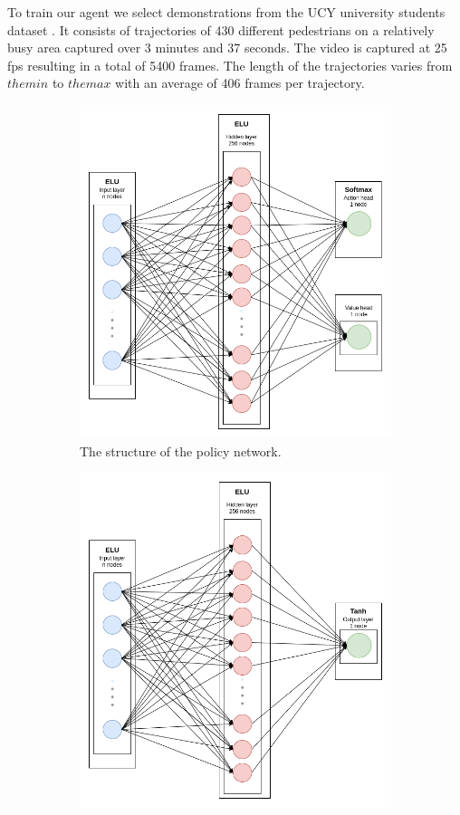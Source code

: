 To train our agent we select demonstrations from the UCY university students dataset \cite{ucy-dataset-university-students}. It consists of trajectories of 430 different pedestrians on a relatively busy area captured over 3 minutes and 37 seconds. The video is captured at 25 fps resulting in a total of 5400 frames. The length of the trajectories varies from $the min$  to $the max$ with an average of 406 frames per trajectory. 
\begin{figure}
    	\begin{subfigure}[b]{.5\textwidth}
    	\centering
    	\includegraphics[width=.9\linewidth]{figures/policy_network.png}
    	\caption{The structure of the policy network.}
    	\label{fig:policy-network}
    \end{subfigure}%
    \begin{subfigure}[b]{.5\textwidth}
    	\centering
    	\includegraphics[width=.9\linewidth]{figures/reward_network.png}

\end{subfigure}
\end{figure}
